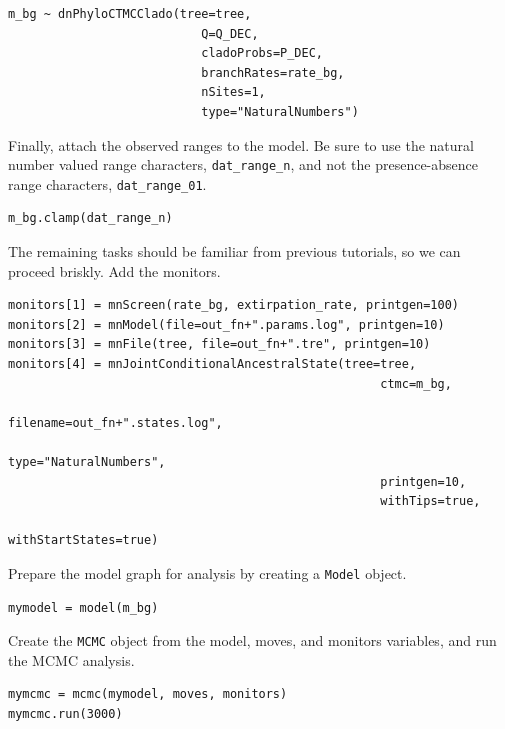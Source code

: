 \begin{snugshade}
\begin{lstlisting}
m_bg ~ dnPhyloCTMCClado(tree=tree,
                           Q=Q_DEC,
                           cladoProbs=P_DEC,
                           branchRates=rate_bg,
                           nSites=1,
                           type="NaturalNumbers")
\end{lstlisting}
\end{snugshade}

Finally, attach the observed ranges to the model.
Be sure to use the natural number valued range characters, {\tt dat\_range\_n}, and not the presence-absence range characters, {\tt dat\_range\_01}.

\begin{snugshade}
\begin{lstlisting}
m_bg.clamp(dat_range_n)
\end{lstlisting}
\end{snugshade}

The remaining tasks should be familiar from previous tutorials, so we can proceed briskly.
Add the monitors.

\begin{snugshade}
\begin{lstlisting}
monitors[1] = mnScreen(rate_bg, extirpation_rate, printgen=100)
monitors[2] = mnModel(file=out_fn+".params.log", printgen=10)
monitors[3] = mnFile(tree, file=out_fn+".tre", printgen=10)
monitors[4] = mnJointConditionalAncestralState(tree=tree,
                                                    ctmc=m_bg,
                                                    filename=out_fn+".states.log",
                                                    type="NaturalNumbers",
                                                    printgen=10,
                                                    withTips=true,
                                                    withStartStates=true)
\end{lstlisting}
\end{snugshade}

Prepare the model graph for analysis by creating a {\tt Model} object.
\begin{snugshade}
\begin{lstlisting}
mymodel = model(m_bg)
\end{lstlisting}
\end{snugshade}


Create the {\tt MCMC} object from the model, moves, and monitors variables, and run the MCMC analysis.
\begin{snugshade}
\begin{lstlisting}
mymcmc = mcmc(mymodel, moves, monitors)
mymcmc.run(3000)
\end{lstlisting}
\end{snugshade}


